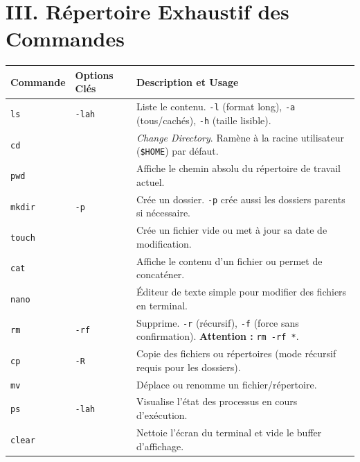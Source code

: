 \documentclass[11pt,a4paper]{article}
\begin{document}
\section{III. Répertoire Exhaustif des Commandes}

\begin{tabularx}{\textwidth}{|l|l|X|}
\hline
\textbf{Commande} & \textbf{Options Clés} & \textbf{Description et Usage} \\
\hline
\texttt{ls} & \texttt{-lah} & Liste le contenu. \texttt{-l} (format long), \texttt{-a} (tous/cachés), \texttt{-h} (taille lisible). \\
\hline
\texttt{cd} & & \textit{Change Directory}. Ramène à la racine utilisateur (\texttt{\$HOME}) par défaut. \\
\hline
\texttt{pwd} & & Affiche le chemin absolu du répertoire de travail actuel. \\
\hline
\texttt{mkdir} & \texttt{-p} & Crée un dossier. \texttt{-p} crée aussi les dossiers parents si nécessaire. \\
\hline
\texttt{touch} & & Crée un fichier vide ou met à jour sa date de modification. \\
\hline
\texttt{cat} & & Affiche le contenu d'un fichier ou permet de concaténer. \\
\hline
\texttt{nano} & & Éditeur de texte simple pour modifier des fichiers en terminal. \\
\hline
\texttt{rm} & \texttt{-rf} & Supprime. \texttt{-r} (récursif), \texttt{-f} (force sans confirmation). \textbf{Attention : } \texttt{rm -rf *}. \\
\hline
\texttt{cp} & \texttt{-R} & Copie des fichiers ou répertoires (mode récursif requis pour les dossiers). \\
\hline
\texttt{mv} & & Déplace ou renomme un fichier/répertoire. \\
\hline
\texttt{ps} & \texttt{-lah} & Visualise l'état des processus en cours d'exécution. \\
\hline
\texttt{clear} & & Nettoie l'écran du terminal et vide le buffer d'affichage. \\
\hline
\end{tabularx}
\end{document}
